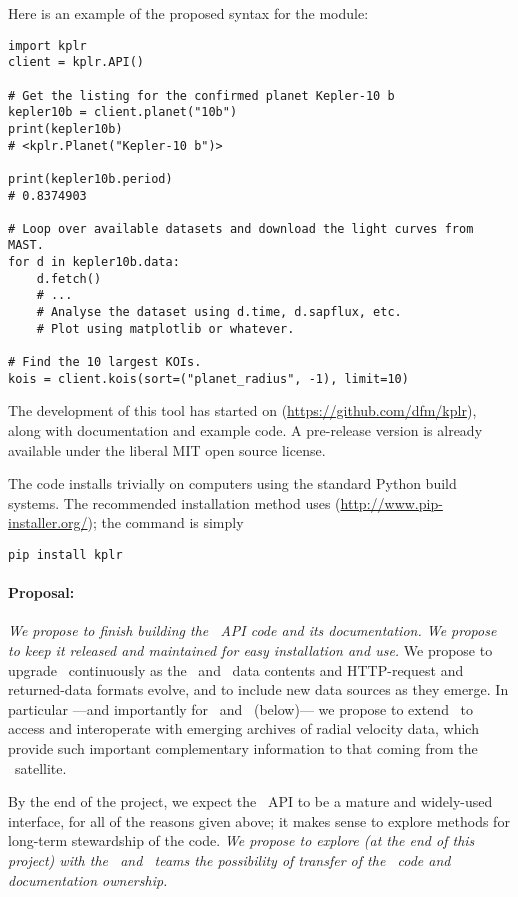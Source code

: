 \documentclass[letterpaper,12pt,preprint]{hack_aastex}
\newcommand{\hurl}[1]{{\scriptsize\url{#1}}}
\newcommand{\kplr}{\package{kplr}}
\newcommand{\Bart}{\package{Bart}}
\newcommand{\TheCreator}{\package{TheCreator}}
\begin{document}
Here is an example of the proposed syntax for the module:
\begin{lstlisting}
import kplr
client = kplr.API()

# Get the listing for the confirmed planet Kepler-10 b
kepler10b = client.planet("10b")
print(kepler10b)
# <kplr.Planet("Kepler-10 b")>

print(kepler10b.period)
# 0.8374903

# Loop over available datasets and download the light curves from MAST.
for d in kepler10b.data:
    d.fetch()
    # ...
    # Analyse the dataset using d.time, d.sapflux, etc.
    # Plot using matplotlib or whatever.

# Find the 10 largest KOIs.
kois = client.kois(sort=("planet_radius", -1), limit=10)
\end{lstlisting}
The development of this tool has started on 
(\hurl{https://github.com/dfm/kplr}),
along with documentation and example code.
A pre-release version is already available under the liberal MIT open source
license.

The code installs trivially on computers using the standard Python build
systems. The recommended installation method uses 
(\hurl{http://www.pip-installer.org/}); the command is simply
\begin{lstlisting}
pip install kplr
\end{lstlisting}

\paragraph{Proposal:}
\emph{We propose to finish building the \kplr\ API code and its documentation.
We propose to keep it released and maintained for easy installation and use.}
We propose to upgrade \kplr\ continuously as the \MAST\ and \EA\ data contents and
HTTP-request and returned-data formats evolve,
and to include new data sources as they emerge.
In particular%
---and importantly for \Bart\ and \TheCreator\ (below)---%
we propose to extend \kplr\ to access and interoperate with
emerging archives of radial velocity data,
which provide such important complementary information to that coming from
the \Kepler\ satellite.

By the end of the project,
we expect the \kplr\ API to be a mature and widely-used interface,
for all of the reasons given above;
it makes sense to explore methods for long-term stewardship of the code.
\emph{We propose to explore (at the end of this project) with the \MAST\ and \EA\ teams the possibility of
transfer of the \kplr\ code and documentation ownership.}
\end{document}
